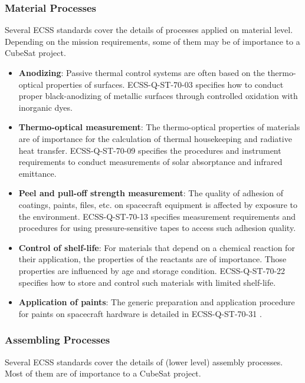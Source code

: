\subsubsection{Material Processes}

Several ECSS standards cover the details of processes applied on material level. Depending on the mission requirements, some of them may be of importance to a CubeSat project.

\begin{itemize}
\item \textbf{Anodizing}: Passive thermal control systems are often based on the thermo-optical properties of surfaces. ECSS-Q-ST-70-03 \cite{ECSS-Q-ST-70-03} specifies how to conduct proper black-anodizing of metallic surfaces through controlled oxidation with inorganic dyes.
\item \textbf{Thermo-optical measurement}: The thermo-optical properties of materials are of importance for the calculation of thermal housekeeping and radiative heat transfer. ECSS-Q-ST-70-09 \cite{ECSS-Q-ST-70-09} specifies the procedures and instrument requirements to conduct measurements of solar absorptance and infrared emittance.
\item \textbf{Peel and pull-off strength measurement}: The quality of adhesion of coatings, paints, files, etc. on spacecraft equipment is affected by exposure to the environment. ECSS-Q-ST-70-13 \cite{ECSS-Q-ST-70-13} specifies measurement requirements and procedures for using pressure-sensitive tapes to access such adhesion quality.
\item \textbf{Control of shelf-life}: For materials that depend on a chemical reaction for their application, the properties of the reactants are of importance. Those properties are influenced by age and storage condition. ECSS-Q-ST-70-22 \cite{ECSS-Q-ST-70-22} specifies how to store and control such materials with limited shelf-life.
\item \textbf{Application of paints}: The generic preparation and application procedure for paints on spacecraft hardware is detailed in ECSS-Q-ST-70-31 \cite{ECSS-Q-ST-70-31}.
\end{itemize}

\subsubsection{Assembling Processes}

Several ECSS standards cover the details of (lower level) assembly processes. Most of them are of importance to a CubeSat project.


